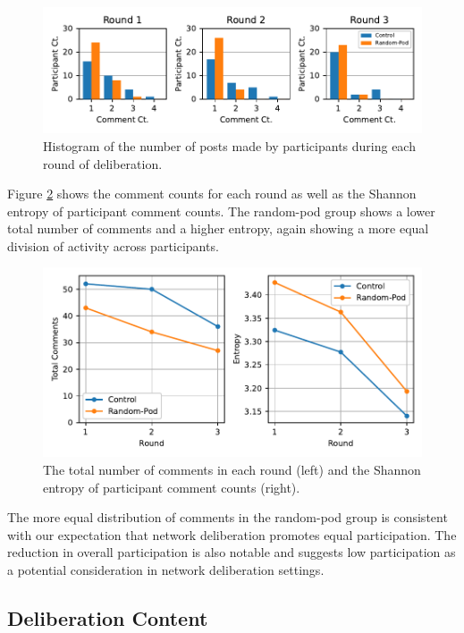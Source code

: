 {\begin{figure}
    \centering
    \includegraphics[width=6in]{chapters/figures/NetDelibExp/fig-comment-counts.pdf}
    \caption{Histogram of the number of posts made by participants during each round of deliberation.}
    \label{fig:commentcounts}
\end{figure}

Figure \ref{fig:commentrounds} shows the comment counts for each round as well as the Shannon entropy of participant comment counts.
The random-pod group shows a lower total number of comments and a higher entropy, again showing a more equal division of activity across participants.

\begin{figure}
    \centering
    \includegraphics[width=6in]{chapters/figures/NetDelibExp/fig-comment-rounds.pdf}
    \caption{The total number of comments in each round (left) and the Shannon entropy of participant comment counts (right).}
    \label{fig:commentrounds}
\end{figure}

The more equal distribution of comments in the random-pod group is consistent with our expectation that network deliberation promotes equal participation.
The reduction in overall participation is also notable and suggests low participation as a potential consideration in network deliberation settings.


\subsection{Deliberation Content}
\label{sec:res-content}

}
